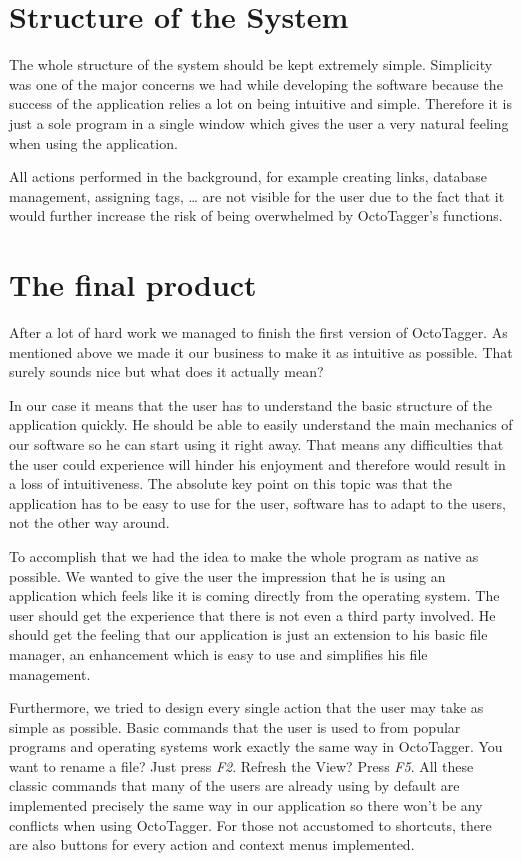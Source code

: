 \def\kapitelautor{Christoph Führer}

\section{Structure of the System}
The whole structure of the system should be kept extremely simple. Simplicity was one of the major concerns we had while developing the software because the success of the application relies a lot on being intuitive and simple. Therefore it is just a sole program in a single window which gives the user a very natural feeling when using the application.

All actions performed in the background, for example creating links, database management, assigning tags, \ldots{} are not visible for the user due to the fact that it would further increase the risk of being overwhelmed by OctoTagger's functions.

\section{The final product}
After a lot of hard work we managed to finish the first version of OctoTagger. As mentioned above we made it our business to make it as intuitive as possible. That surely sounds nice but what does it actually mean?

In our case it means that the user has to understand the basic structure of the application quickly. He should be able to easily understand the main mechanics of our software so he can start using it right away. That means any difficulties that the user could experience will hinder his enjoyment and therefore would result in a loss of intuitiveness. The absolute key point on this topic was that the application has to be easy to use for the user, software has to adapt to the users, not the other way around.

To accomplish that we had the idea to make the whole program as native as possible. We wanted to give the user the impression that he is using an application which feels like it is coming directly from the operating system. The user should get the experience that there is not even a third party involved. He should get the feeling that our application is just an extension to his basic file manager, an enhancement which is easy to use and simplifies his file management.

Furthermore, we tried to design every single action that the user may take as simple as possible. Basic commands that the user is used to from popular programs and operating systems work exactly the same way in OctoTagger. You want to rename a file? Just press \textit{F2}. Refresh the View? Press \textit{F5}. All these classic commands that many of the users are already using by default are implemented precisely the same way in our application so there won't be any conflicts when using OctoTagger. For those not accustomed to shortcuts, there are also buttons for every action and context menus implemented.

